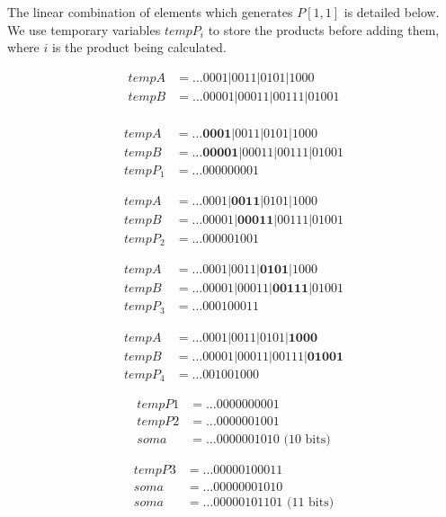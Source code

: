 \documentclass[12pt]{article}
\begin{document}
The linear combination of elements which generates $P[1,1]$ is detailed below.
We use temporary variables $tempP_i$ to store the products before adding them,
where $i$ is the product being calculated.

\begin{align*}
 tempA&= \ldots0001|0011|0101|1000\\
 tempB&= \ldots00001|00011|00111|01001\\
\end{align*}

\begin{align*}
 tempA&= \ldots\textbf{0001}|0011|0101|1000\\
 tempB&= \ldots\textbf{00001}|00011|00111|01001\\
 tempP_1&= \ldots000000001
\end{align*}

\begin{align*}
 tempA&= \ldots0001|\textbf{0011}|0101|1000\\
 tempB&= \ldots00001|\textbf{00011}|00111|01001\\
 tempP_2&= \ldots000001001
\end{align*}

\begin{align*}
 tempA&= \ldots0001|0011|\textbf{0101}|1000\\
 tempB&= \ldots00001|00011|\textbf{00111}|01001\\
 tempP_3&= \ldots000100011
\end{align*}

\begin{align*}
 tempA&= \ldots0001|0011|0101|\textbf{1000}\\
 tempB&= \ldots00001|00011|00111|\textbf{01001}\\
 tempP_4&= \ldots001001000
\end{align*}



\begin{align*}
 tempP1&= \ldots0000000001 \\
 tempP2&= \ldots0000001001 \\
   soma&= \ldots0000001010 \text{ (10 bits)}
\end{align*}

\begin{align*}
 tempP3&= \ldots00000100011 \\
   soma&= \ldots00000001010 \\
   soma&= \ldots00000101101 \text{ (11 bits)}
\end{align*}
\end{document}
